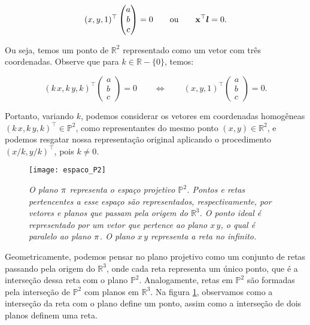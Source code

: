 \begin{equation*}
(x,y,1)^\top 
\begin{pmatrix}
 a  \\ 
 b  \\ 
 c 
 \end{pmatrix} 
 = 0 \qquad 
 \text{ou} 
 \qquad \mathbf{x} ^\top\boldsymbol{l} = 0.
\end{equation*}

Ou seja, temos um ponto de $\mathbb{R}^{2}$ representado como um vetor com três coordenadas. Observe que para $k \in \mathbb{R} - \{0\}$, temos:

\begin{equation*}
(k\,x,k\,y,k)^\top 
\begin{pmatrix}
 a  \\ 
 b  \\ 
 c 
 \end{pmatrix} 
 = 0
 \qquad \Leftrightarrow \qquad
 (x,y,1)^\top
\begin{pmatrix}
 a  \\ 
 b  \\ 
 c 
 \end{pmatrix} 
 = 0.
\end{equation*}

Portanto,  variando $k$, podemos considerar os vetores em coordenadas homogêneas $(k\,x,k\,y,k)^\top \in \mathbb{P}^2$, como representantes do mesmo ponto $(x,y) \in \mathbb{R}^2$, e podemos resgatar nossa representação original aplicando o procedimento $(x/k,y/k)^\top$, pois $k \ne 0$.

\begin{figure}[!htb]
\centering
\texttt{[image: espaco\_P2]}
\caption{\textit{O plano $\pi$ representa o espaço projetivo $\mathbb{P}^2$. Pontos e retas pertencentes a esse espaço são representados, respectivamente, por vetores e planos que passam pela origem do $\mathbb{R}^3$. O ponto ideal é representado por um vetor que pertence ao plano $x\,y$, o qual é paralelo ao plano $\pi$. O plano $x\,y$ representa a reta no infinito.}}
\label{plano_P2}
\end{figure}

Geometricamente, podemos pensar no plano projetivo como um conjunto de retas passando pela origem do $\mathbb{R}^3$, onde cada reta representa um único ponto, que é a interseção dessa reta com o plano $\mathbb{P}^2$. Analogamente, retas em $\mathbb{P}^2$ são formadas pela interseção de $\mathbb{P}^2$ com planos em $\mathbb{R}^3$. Na figura \ref{plano_P2}, observamos como a interseção da reta com o plano define um ponto, assim como a interseção de dois planos definem uma reta.


